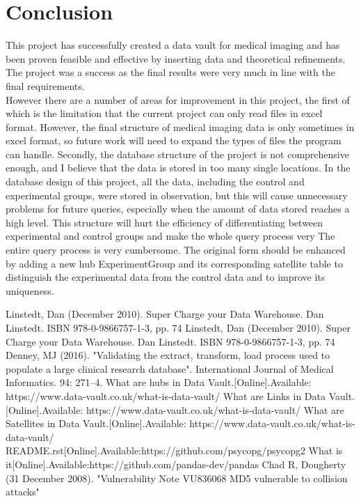 \documentclass[conference]{IEEEtran}
\begin{document}
\section{Conclusion}
This project has successfully created a data vault for medical imaging and has been proven feasible and effective by inserting data and theoretical refinements. The project was a success as the final results were very much in line with the final requirements.\\
\hspace*{0.2cm} However there are a number of areas for improvement in this project, the first of which is the limitation that the current project can only read files in excel format. However, the final structure of medical imaging data is only sometimes in excel format, so future work will need to expand the types of files the program can handle. Secondly, the database structure of the project is not comprehensive enough, and I believe that the data is stored in too many single locations. In the database design of this project, all the data, including the control and experimental groups, were stored in observation, but this will cause unnecessary problems for future queries, especially when the amount of data stored reaches a high level. This structure will hurt the efficiency of differentiating between experimental and control groups and make the whole query process very The entire query process is very cumbersome. The original form should be enhanced by adding a new hub ExperimentGroup and its corresponding satellite table to distinguish the experimental data from the control data and to improve its uniqueness.

\begin{thebibliography}{00}
 Linstedt, Dan (December 2010). Super Charge your Data Warehouse. Dan Linstedt. ISBN 978-0-9866757-1-3, pp. 74
 Linstedt, Dan (December 2010). Super Charge your Data Warehouse. Dan Linstedt. ISBN 978-0-9866757-1-3, pp. 74
 Denney, MJ (2016). "Validating the extract, transform, load process used to populate a large clinical research database". International Journal of Medical Informatics. 94: 271–4.
 What are hubs in Data Vault.[Online].Available: https://www.data-vault.co.uk/what-is-data-vault/
 What are Links in Data Vault.[Online].Available: https://www.data-vault.co.uk/what-is-data-vault/
 What are Satellites in Data Vault.[Online].Available: https://www.data-vault.co.uk/what-is-data-vault/
 README.rst[Online].Available:https://github.com/psycopg/psycopg2
 What is it[Online].Available:https://github.com/pandas-dev/pandas
 Chad R, Dougherty (31 December 2008). "Vulnerability Note VU836068 MD5 vulnerable to collision attacks"
\end{thebibliography}
\end{document}
